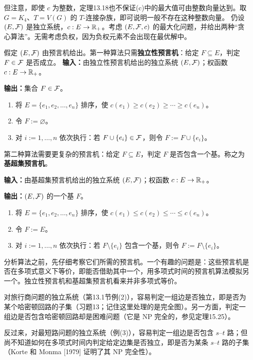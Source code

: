 但注意，即使 $c$ 为整数，定理13.18也不保证(c)中的最大值可由整数向量达到。取 $G=K_4$、$T=V(G)$ 的 $T$-连接杂族，即可说明一般不存在这种整数向量。
仍设 $(E,\mathcal F)$ 是独立系统，$c:E\to\mathbb R_+$。考虑 $(E,\mathcal F,c)$ 的最大化问题，并给出两种“贪心算法”。无需考虑负权，因为负权元素不会出现在最优解中。

假定 $(E,\mathcal F)$ 由预言机给出。第一种算法只需\textbf{独立性预言机}：给定 $F\subseteq E$，判定 $F\in\mathcal F$ 是否成立。
\textbf{输入：}由独立性预言机给出的独立系统 $(E,\mathcal F)$；权函数 $c:E\to\mathbb R_+$。\par
\textbf{输出：}集合 $F\in\mathcal F$。
\begin{enumerate}[label=\arabic*.]
\item 将 $E=\{e_1,e_2,\ldots,e_n\}$ 排序，使 $c(e_1)\ge c(e_2)\ge\cdots\ge c(e_n)$。
\item 令 $F:=\varnothing$。
\item 对 $i:=1,\ldots,n$ 依次执行：若 $F\cup\{e_i\}\in\mathcal F$，则令 $F:=F\cup\{e_i\}$。
\end{enumerate}
第二种算法需要更复杂的预言机：给定 $F\subseteq E$，判定 $F$ 是否包含一个基。称之为\textbf{基超集预言机}。

\textbf{输入：}由基超集预言机给出的独立系统 $(E,\mathcal F)$；权函数 $c:E\to\mathbb R_+$。\par
\textbf{输出：}$(E,\mathcal F)$ 的一个基 $F$。
\begin{enumerate}[label=\arabic*.]
\item 将 $E=\{e_1,e_2,\ldots,e_n\}$ 排序，使 $c(e_1)\le c(e_2)\le\cdots\le c(e_n)$。
\item 令 $F:=E$。
\item 对 $i:=1,\ldots,n$ 依次执行：若 $F\setminus\{e_i\}$ 包含一个基，则令 $F:=F\setminus\{e_i\}$。
\end{enumerate}
分析算法之前，先仔细考察它们所需的预言机。一个有趣的问题是：这些预言机是否在多项式意义下等价，即能否借助其中一个，用多项式时间的预言机算法模拟另一个。独立性预言机和基超集预言机看来并非多项式等价。

对旅行商问题的独立系统（第13.1节例(2)），容易判定一组边是否独立，即是否为某个哈密顿回路的子集（习题13；记住这里处理的是完全图）。另一方面，判定一组边是否包含哈密顿回路却是困难问题（它是 NP 完全的，参见定理15.25）。

反过来，对最短路问题的独立系统（例(3)），容易判定一组边是否包含 $s$--$t$ 路；但尚不知道如何在多项式时间内判定给定边集是否独立，即是否为某条 $s$--$t$ 路的子集（Korte 和 Monma [1979] 证明了其 NP 完全性）。

